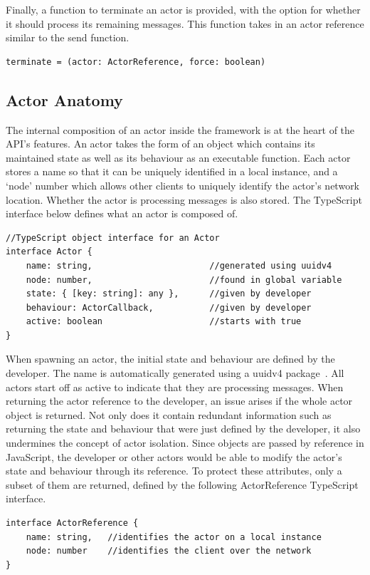 \documentclass[oneside]{um-fict}
\begin{document}
Finally, a function to terminate an actor is provided, with the option for whether it should process its remaining messages. This function takes in an actor reference similar to the send function.
\begin{lstlisting}
terminate = (actor: ActorReference, force: boolean)
\end{lstlisting}

\subsection{Actor Anatomy}
The internal composition of an actor inside the framework is at the heart of the API's features. An actor takes the form of an object which contains its maintained state as well as its behaviour as an executable function. Each actor stores a name so that it can be uniquely identified in a local instance, and a `node' number which allows other clients to uniquely identify the actor's network location. Whether the actor is processing messages is also stored. The TypeScript interface below defines what an actor is composed of.
\begin{lstlisting}
//TypeScript object interface for an Actor
interface Actor {
    name: string,                       //generated using uuidv4
    node: number,                       //found in global variable
    state: { [key: string]: any },      //given by developer
    behaviour: ActorCallback,           //given by developer
    active: boolean                     //starts with true
}
\end{lstlisting}
When spawning an actor, the initial state and behaviour are defined by the developer. The name is automatically generated using a uuidv4 package~\cite{uuidv4}. All actors start off as active to indicate that they are processing messages. When returning the actor reference to the developer, an issue arises if the whole actor object is returned. Not only does it contain redundant information such as returning the state and behaviour that were just defined by the developer, it also undermines the concept of actor isolation. Since objects are passed by reference in JavaScript, the developer or other actors would be able to modify the actor's state and behaviour through its reference. To protect these attributes, only a subset of them are returned, defined by the following ActorReference TypeScript interface.
\begin{lstlisting}
interface ActorReference {
    name: string,   //identifies the actor on a local instance
    node: number    //identifies the client over the network
}
\end{lstlisting}
\end{document}
